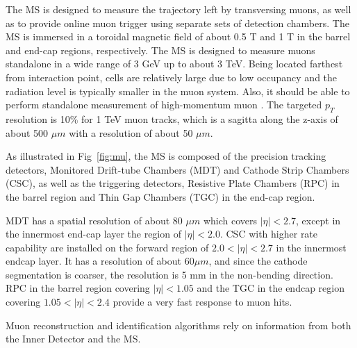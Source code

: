 \par The MS \cite{CERN-LHCC-97-022} is designed to measure the trajectory left by transversing muons, as well as to provide online muon trigger using separate sets of detection chambers. The MS is immersed in a toroidal magnetic field of about 0.5 T and 1 T in the barrel and end-cap regions, respectively. The MS is designed to measure muons standalone in a wide range of 3 GeV up to about 3 TeV. 
Being located farthest from interaction point, cells are relatively large due to low occupancy and the radiation level is typically 
smaller in the muon system. 
Also, it should be able to perform standalone measurement of high-momentum muon \cite{muon}.
The targeted $p_T$ resolution is 10\% for 1 TeV muon tracks, which is a sagitta along the z-axis of about 500 $\mu m$ with a resolution of about 50 $\mu m$.
\par As illustrated in Fig~\ref{fig:mu}, the MS is composed of the precision tracking detectors, Monitored Drift-tube Chambers (MDT) and Cathode Strip Chambers (CSC), as well as the triggering detectors, Resistive Plate Chambers (RPC) in the barrel region and Thin Gap Chambers (TGC) in the end-cap region.
\par MDT has a spatial resolution of about 80 $\mu m$ which covers $|\eta| < 2.7$, except in the innermost end-cap layer the region of $|\eta| < 2.0$. CSC with higher rate capability are installed on the forward region of $2.0 < |\eta| < 2.7$ in the innermost endcap layer. It has a resolution of about 60$\mu m$, and since the cathode segmentation is coarser, the resolution is 5 mm in the non-bending direction.	RPC in the barrel region covering $|\eta| < 1.05$ and the TGC in the endcap region covering $1.05 < |\eta| < 2.4$ provide a very fast response to muon hits.
\par Muon reconstruction and identification algorithms rely on information from both the Inner Detector and the MS.

